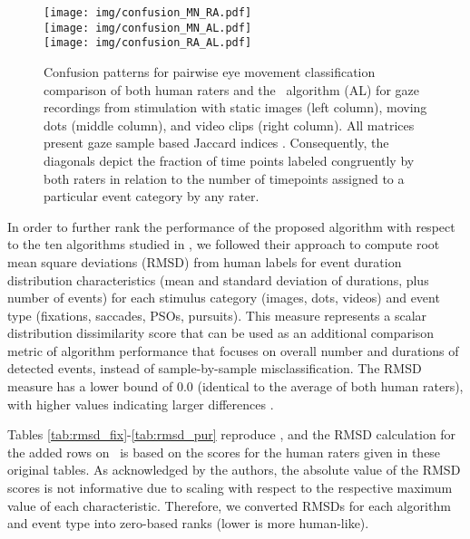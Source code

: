 \begin{figure*}
  \texttt{[image: img/confusion\_MN\_RA.pdf]} \\
  \texttt{[image: img/confusion\_MN\_AL.pdf]} \\
  \texttt{[image: img/confusion\_RA\_AL.pdf]}

  \caption{Confusion patterns for pairwise eye movement classification
    comparison of both human raters \citep[MN and RA; ][]{Andersson2017} and the
    \remodnav\ algorithm (AL) for gaze recordings from stimulation with static
    images (left column), moving dots (middle column), and video clips (right
    column).  All matrices present gaze sample based Jaccard indices \citep[JI;
    ][]{jaccard1901etude}. Consequently, the diagonals depict the fraction of
    time points labeled congruently by both raters in relation to the number of
    timepoints assigned to a particular event category by any rater.}
  \label{fig:conf}
\end{figure*}


In order to further rank the performance of the proposed algorithm with respect
to the ten algorithms studied in \citet{Andersson2017}, we followed their
approach to compute root mean square deviations (RMSD) from human labels for
event duration distribution characteristics (mean and standard deviation of
durations, plus number of events) for each stimulus category (images, dots,
videos) and event type (fixations, saccades, PSOs, pursuits). This measure
represents a scalar distribution dissimilarity score that can be used as an
additional comparison metric of algorithm performance that focuses on overall
number and durations of detected events, instead of sample-by-sample
misclassification. The RMSD measure has a lower bound of $0.0$ (identical to
the average of both human raters), with higher values indicating larger
differences \citep[for detail information on the calculation of this metric
see][]{Andersson2017}.

Tables \ref{tab:rmsd_fix}-\ref{tab:rmsd_pur} reproduce \citet[Tables
3-6]{Andersson2017}, and the RMSD calculation for the added rows on \remodnav\
is based on the scores for the human raters given in these original tables. As
acknowledged by the authors, the absolute value of the RMSD scores is not
informative due to scaling with respect to the respective maximum value of each
characteristic.  Therefore, we converted RMSDs for each algorithm and event
type into zero-based ranks (lower is more human-like).

